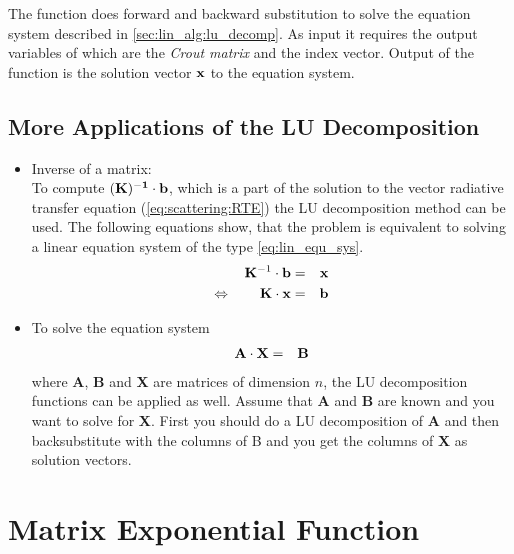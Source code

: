 The function  does forward and backward
substitution to solve the equation system described in
\ref{sec:lin_alg:lu_decomp}. As input it requires the output variables of
 which are the {\sl Crout matrix} and the index
vector. Output of the function is the solution vector ${\bf x}$ to the
equation system.


\subsection{More Applications of the LU Decomposition}
\label{lu_applications}

\begin{itemize}
\item Inverse of a matrix:\\
  To compute $(\bf K)^{-1}\cdot{\bf b}$, which is a part of the
solution to the vector radiative transfer equation (\ref{eq:scattering:RTE}) the LU
decomposition method can be used. The following equations show, that
the problem is equivalent to  solving a linear equation system of the type
\ref{eq:lin_equ_sys}.
\begin{eqnarray}
  {\bf K}^{-1}\cdot{\bf b} &=& {\bf x}\\
\Leftrightarrow \qquad  {\bf K}\cdot{\bf x} &=& {\bf b}
\end{eqnarray}

\item To solve the equation system
  \begin{eqnarray}
    {\bf A}\cdot{\bf X} &=& {\bf B}
  \end{eqnarray}
where {\bf A}, {\bf B} and  {\bf X} are matrices of dimension
$n$, the LU decomposition functions can be applied as well. Assume
that {\bf A} and {\bf B} are known and you want to solve for {\bf
 X}.
First you should do a LU decomposition of  {\bf A} and then
backsubstitute with the columns of B and you get the columns of {\bf
  X} as solution vectors.

\end{itemize}

\section{Matrix Exponential Function}
\label{sec:lin_alg:mat_exp}

